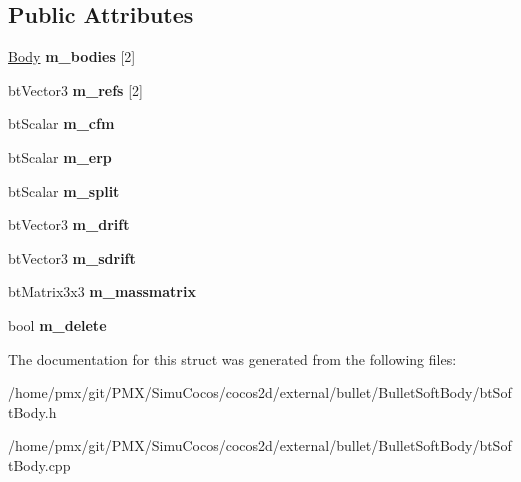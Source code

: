 \subsection*{Public Attributes}
\begin{DoxyCompactItemize}
\item 
\mbox{\label{structbtSoftBody_1_1Joint_a8020996a1e17a05bb1f82b452858fef8}} 
\hyperlink{structbtSoftBody_1_1Body}{Body} {\bfseries m\+\_\+bodies} \mbox{[}2\mbox{]}
\item 
\mbox{\label{structbtSoftBody_1_1Joint_abe0ba38a89d753938cbd6d3fece0a29a}} 
bt\+Vector3 {\bfseries m\+\_\+refs} \mbox{[}2\mbox{]}
\item 
\mbox{\label{structbtSoftBody_1_1Joint_a4edd7242f07b07ee9912284d21b159f1}} 
bt\+Scalar {\bfseries m\+\_\+cfm}
\item 
\mbox{\label{structbtSoftBody_1_1Joint_a9c5f5b382fcd0469b7b74bfa8abc9e9a}} 
bt\+Scalar {\bfseries m\+\_\+erp}
\item 
\mbox{\label{structbtSoftBody_1_1Joint_a310e024b55848099960bd2c9878f13a7}} 
bt\+Scalar {\bfseries m\+\_\+split}
\item 
\mbox{\label{structbtSoftBody_1_1Joint_a0619c879a22241b7225895a7e2ba3dec}} 
bt\+Vector3 {\bfseries m\+\_\+drift}
\item 
\mbox{\label{structbtSoftBody_1_1Joint_a2178a6aa48eb0d56901f38d7301c6448}} 
bt\+Vector3 {\bfseries m\+\_\+sdrift}
\item 
\mbox{\label{structbtSoftBody_1_1Joint_aa82a5e3696e8d4f58b2b1a3391d51cec}} 
bt\+Matrix3x3 {\bfseries m\+\_\+massmatrix}
\item 
\mbox{\label{structbtSoftBody_1_1Joint_a7eacf40a4cb57e30445e486b213a62ea}} 
bool {\bfseries m\+\_\+delete}
\end{DoxyCompactItemize}


The documentation for this struct was generated from the following files\+:\begin{DoxyCompactItemize}
\item 
/home/pmx/git/\+P\+M\+X/\+Simu\+Cocos/cocos2d/external/bullet/\+Bullet\+Soft\+Body/bt\+Soft\+Body.\+h\item 
/home/pmx/git/\+P\+M\+X/\+Simu\+Cocos/cocos2d/external/bullet/\+Bullet\+Soft\+Body/bt\+Soft\+Body.\+cpp\end{DoxyCompactItemize}
